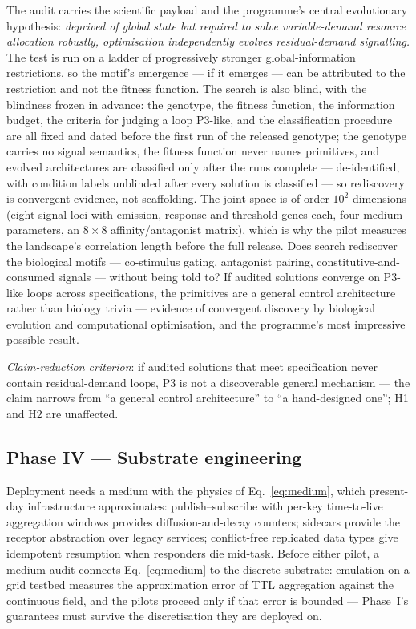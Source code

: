 \documentclass[twoside,twocolumn,usenatbib]{mnras}
\begin{document}
The audit carries the scientific payload and the programme's central
evolutionary hypothesis: \emph{deprived of global state but required
to solve variable-demand resource allocation robustly, optimisation
independently evolves residual-demand signalling.} The test is run on
a ladder of progressively stronger global-information restrictions,
so the motif's emergence --- if it emerges --- can be attributed to
the restriction and not the fitness function. The search is also
blind, with the blindness frozen in advance: the genotype, the fitness
function, the information budget, the criteria for judging a loop
P3-like, and the classification procedure are all fixed and dated
before the first run of the released genotype; the genotype carries no
signal semantics, the fitness function
never names primitives, and evolved architectures are classified only
after the runs complete --- de-identified, with condition labels
unblinded after every solution is classified --- so rediscovery is
convergent evidence, not scaffolding. The joint space is of order
$10^2$ dimensions (eight signal loci with emission, response and
threshold genes each, four medium parameters, an $8 \times 8$
affinity/antagonist matrix), which is why the pilot measures the
landscape's correlation length before the full release. Does search
rediscover the biological motifs --- co-stimulus gating, antagonist
pairing, constitutive-and-consumed signals --- without being told to?
If audited solutions
converge on P3-like loops across specifications, the primitives are a
general control architecture rather than biology trivia --- evidence
of convergent discovery by biological evolution and computational
optimisation, and the programme's most impressive possible result.

\emph{Claim-reduction criterion}: if audited solutions that meet
specification never contain residual-demand loops, P3 is not a
discoverable general mechanism --- the claim narrows from ``a general
control architecture'' to ``a hand-designed one''; H1 and H2 are
unaffected.

\subsection{Phase IV --- Substrate engineering}

Deployment needs a medium with the physics of Eq.~\ref{eq:medium},
which present-day infrastructure approximates: publish--subscribe with
per-key time-to-live aggregation windows provides diffusion-and-decay
counters; sidecars provide the receptor abstraction over legacy
services; conflict-free replicated data types \citep{shapiro2011} give
idempotent resumption when responders die mid-task. Before either
pilot, a medium audit connects Eq.~\ref{eq:medium} to the discrete
substrate: emulation on a grid testbed measures the approximation
error of TTL aggregation against the continuous field, and the pilots
proceed only if that error is bounded --- Phase~I's guarantees must
survive the discretisation they are deployed on.
\end{document}
